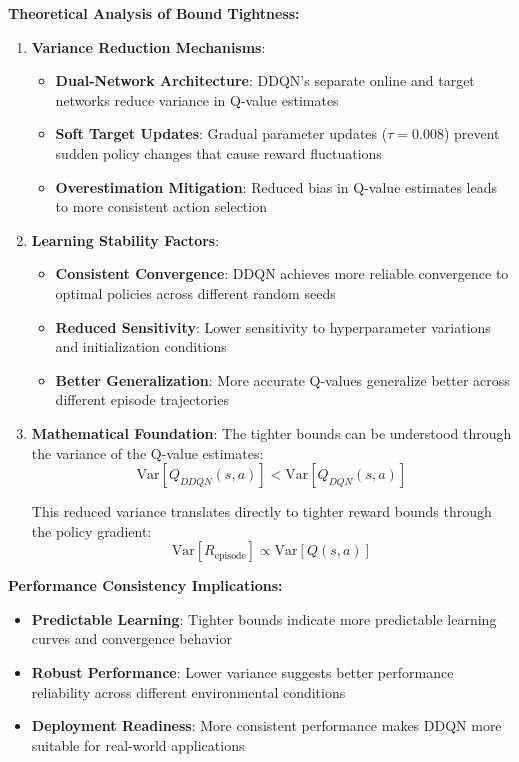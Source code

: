 \documentclass[12pt]{article}
\begin{document}
{{{\textbf{Theoretical Analysis of Bound Tightness:}

\begin{enumerate}
    \item \textbf{Variance Reduction Mechanisms}:
    \begin{itemize}
        \item \textbf{Dual-Network Architecture}: DDQN's separate online and target networks reduce variance in Q-value estimates
        \item \textbf{Soft Target Updates}: Gradual parameter updates ($\tau = 0.008$) prevent sudden policy changes that cause reward fluctuations
        \item \textbf{Overestimation Mitigation}: Reduced bias in Q-value estimates leads to more consistent action selection
    \end{itemize}
    
    \item \textbf{Learning Stability Factors}:
    \begin{itemize}
        \item \textbf{Consistent Convergence}: DDQN achieves more reliable convergence to optimal policies across different random seeds
        \item \textbf{Reduced Sensitivity}: Lower sensitivity to hyperparameter variations and initialization conditions
        \item \textbf{Better Generalization}: More accurate Q-values generalize better across different episode trajectories
    \end{itemize}
    
    \item \textbf{Mathematical Foundation}:
    The tighter bounds can be understood through the variance of the Q-value estimates:
    $$\text{Var}[Q_{DDQN}(s,a)] < \text{Var}[Q_{DQN}(s,a)]$$
    
    This reduced variance translates directly to tighter reward bounds through the policy gradient:
    $$\text{Var}[R_{\text{episode}}] \propto \text{Var}[Q(s,a)]$$
\end{enumerate}

\textbf{Performance Consistency Implications:}
\begin{itemize}
    \item \textbf{Predictable Learning}: Tighter bounds indicate more predictable learning curves and convergence behavior
    \item \textbf{Robust Performance}: Lower variance suggests better performance reliability across different environmental conditions
    \item \textbf{Deployment Readiness}: More consistent performance makes DDQN more suitable for real-world applications
\end{itemize}

}}}
\end{document}
